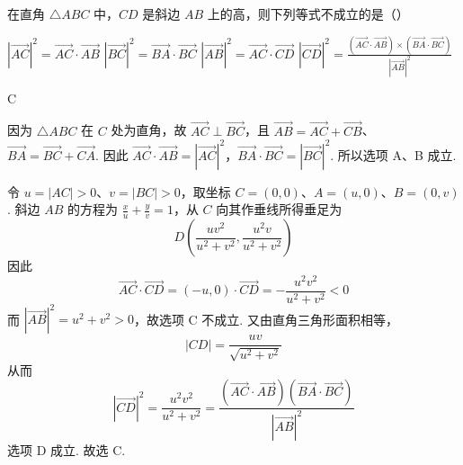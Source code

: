 \begin{problem}
在直角 \(\triangle ABC\) 中，\(CD\) 是斜边 \(AB\) 上的高，则下列等式不成立的是（\quad）

\choices
    {\(\left|\overrightarrow{AC}\right|^2 = \overrightarrow{AC} \cdot \overrightarrow{AB}\)}
    {\(|\overrightarrow{BC}|^2 = \overrightarrow{BA} \cdot \overrightarrow{BC}\)}
    {\(|\overrightarrow{AB}|^2 = \overrightarrow{AC} \cdot \overrightarrow{CD}\)}
    {\( \left|\overrightarrow{CD}\right|^{2}=\frac{\left(\overrightarrow{AC}\cdot\overrightarrow{AB}\right)\times\left(\overrightarrow{BA}\cdot\overrightarrow{BC}\right)}{\left|\overrightarrow{AB}\right|^{2}} \)}

\begin{answer}C\end{answer}

\begin{solution}
因为 \(\triangle ABC\) 在 \(C\) 处为直角，故 \(\overrightarrow{AC}\perp\overrightarrow{BC}\)，且
\(\overrightarrow{AB}=\overrightarrow{AC}+\overrightarrow{CB}\)、\(\overrightarrow{BA}=\overrightarrow{BC}+\overrightarrow{CA}\). 因此
\(\overrightarrow{AC}\cdot\overrightarrow{AB}=|\overrightarrow{AC}|^2\)，\(\overrightarrow{BA}\cdot\overrightarrow{BC}=|\overrightarrow{BC}|^2\).
所以选项 A、B 成立.

令 \(u=|AC|>0\)、\(v=|BC|>0\)，取坐标 \(C=(0,0)\)、\(A=(u,0)\)、\(B=(0,v)\). 斜边 \(AB\) 的方程为 \(\frac{x}{u}+\frac{y}{v}=1\)，从 \(C\) 向其作垂线所得垂足为
\[
D\left(\frac{uv^2}{u^2+v^2},\frac{u^2v}{u^2+v^2}\right)
\]
因此
\[
\overrightarrow{AC}\cdot\overrightarrow{CD}
=(-u,0)\cdot\overrightarrow{CD}
=-\frac{u^2v^2}{u^2+v^2}<0
\]
而 \(|\overrightarrow{AB}|^2=u^2+v^2>0\)，故选项 C 不成立. 又由直角三角形面积相等，
\[
|CD|=\frac{uv}{\sqrt{u^2+v^2}}
\]
从而
\[
|\overrightarrow{CD}|^2=\frac{u^2v^2}{u^2+v^2}=\frac{\left(\overrightarrow{AC}\cdot\overrightarrow{AB}\right)\left(\overrightarrow{BA}\cdot\overrightarrow{BC}\right)}{|\overrightarrow{AB}|^2}
\]
选项 D 成立. 故选 C.
\end{solution}
\end{problem}

